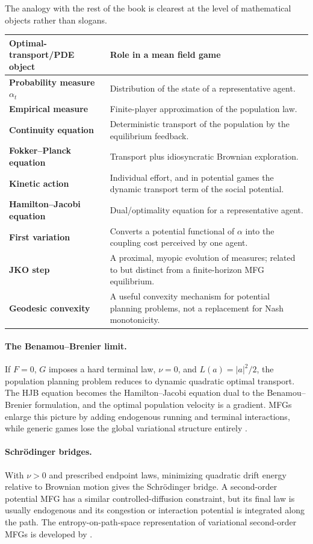 \documentclass[11pt,a4paper]{article}
\theoremstyle{definition}
\newcommand{\abs}[1]{\left\lvert#1\right\rvert}
\newcommand{\al}{\alpha}
\begin{document}
The analogy with the rest of the book is clearest at the level of mathematical
objects rather than slogans.

\begin{center}
\begin{tabularx}{\textwidth}{>{\bfseries}P{.24\textwidth}Y}
\toprule
Optimal-transport/PDE object & Role in a mean field game\\
\midrule
Probability measure $\al_t$ & Distribution of the state of a representative agent.\\
Empirical measure & Finite-player approximation of the population law.\\
Continuity equation & Deterministic transport of the population by the equilibrium feedback.\\
Fokker--Planck equation & Transport plus idiosyncratic Brownian exploration.\\
Kinetic action & Individual effort, and in potential games the dynamic transport term of the social potential.\\
Hamilton--Jacobi equation & Dual/optimality equation for a representative agent.\\
First variation & Converts a potential functional of $\al$ into the coupling cost perceived by one agent.\\
JKO step & A proximal, myopic evolution of measures; related to but distinct from a finite-horizon MFG equilibrium.\\
Geodesic convexity & A useful convexity mechanism for potential planning problems, not a replacement for Nash monotonicity.\\
\bottomrule
\end{tabularx}
\end{center}

\paragraph{The Benamou--Brenier limit.}
If $F=0$, $G$ imposes a hard terminal law, $\nu=0$, and
$L(a)=\abs a^2/2$, the population planning problem reduces to dynamic
quadratic optimal transport.  The HJB equation becomes the Hamilton--Jacobi
equation dual to the Benamou--Brenier formulation, and the optimal population
velocity is a gradient.  MFGs enlarge this picture by adding endogenous
running and terminal interactions, while generic games lose the global
variational structure entirely \citep{BenamouBrenier2000}.

\paragraph{Schr\"odinger bridges.}
With $\nu>0$ and prescribed endpoint laws, minimizing quadratic drift energy
relative to Brownian motion gives the Schr\"odinger bridge.  A second-order
potential MFG has a similar controlled-diffusion constraint, but its final law
is usually endogenous and its congestion or interaction potential is
integrated along the path.  The entropy-on-path-space representation of
variational second-order MFGs is developed by
\citet{BenamouCarlierDiMarinoNenna2019}.
\end{document}

